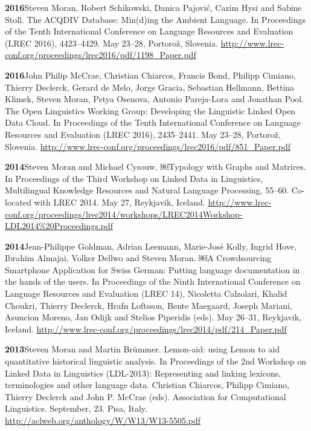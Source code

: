 \documentclass[11pt]{article}
\newcommand{\hangpara}{
 \setlength{\parindent}{0in} %
 \hangindent=0.42in %
}
\begin{document}
\vskip 6pt
\hangpara
{\bf 2016}\hspace{1ex}Steven Moran, Robert Schikowski, Danica Pajovi{\'c}, Cazim Hysi and Sabine Stoll. The ACQDIV Database: Min(d)ing the Ambient Language. In Proceedings of the Tenth International Conference on Language Resources and Evaluation (LREC 2016), 4423--4429. May 23--28, Portoro{\v z}, Slovenia. \url{http://www.lrec-conf.org/proceedings/lrec2016/pdf/1198\_Paper.pdf}

\vskip 6pt
\hangpara
{\bf 2016}\hspace{1ex}John Philip McCrae, Christian Chiarcos, Francis Bond, Philipp Cimiano, Thierry Declerck, Gerard de Melo, Jorge Gracia, Sebastian Hellmann, Bettina Klimek, Steven Moran, Petya Osenova, Antonio Pareja-Lora and Jonathan Pool. The Open Linguistics Working Group: Developing the Linguistic Linked Open Data Cloud. In Proceedings of the Tenth International Conference on Language Resources and Evaluation (LREC 2016), 2435--2441. May 23--28, Portoro{\v z}, Slovenia. \url{http://www.lrec-conf.org/proceedings/lrec2016/pdf/851\_Paper.pdf}

\vskip 6pt
\hangpara
{\bf 2014}\hspace{1ex}Steven Moran and Michael Cysouw. ￼Typology with Graphs and Matrices. In Proceedings of the Third Workshop on Linked Data in Linguistics, Multilingual Knowledge Resources and Natural Language Processing, 55--60. Co-located with LREC 2014. May 27, Reykjavik, Iceland. \url{http://www.lrec-conf.org/proceedings/lrec2014/workshops/LREC2014Workshop-LDL2014\%20Proceedings.pdf}

\vskip 6pt
\hangpara
{\bf 2014}\hspace{1ex}Jean-Philippe Goldman, Adrian Leemann, Marie-Jos{\'e} Kolly, Ingrid Hove, Ibrahim Almajai, Volker Dellwo and Steven Moran. ￼A Crowdsourcing Smartphone Application for Swiss German: Putting language documentation in the hands of the users. In Proceedings of the Ninth International Conference on Language Resources and Evaluation (LREC 14), Nicoletta Calzolari, Khalid Choukri, Thierry Declerck, Hrafn Loftsson, Bente Maegaard, Joseph Mariani, Asuncion Moreno, Jan Odijk and Stelios Piperidis (eds). May 26--31, Reykjavik, Iceland. \url{http://www.lrec-conf.org/proceedings/lrec2014/pdf/214_Paper.pdf}

\vskip 6pt
\hangpara
{\bf 2013}\hspace{1ex}Steven Moran and Martin Br{\"u}mmer. Lemon-aid: using Lemon to aid quantitative historical linguistic analysis. In Proceedings of the 2nd Workshop on Linked Data in Linguistics (LDL-2013): Representing and linking lexicons, terminologies and other language data. Christian Chiarcos, Philipp Cimiano, Thierry Declerck and John P. McCrae (eds). Association for Computational Linguistics. September, 23. Pisa, Italy. \url{http://aclweb.org/anthology/W/W13/W13-5505.pdf}
\end{document}

